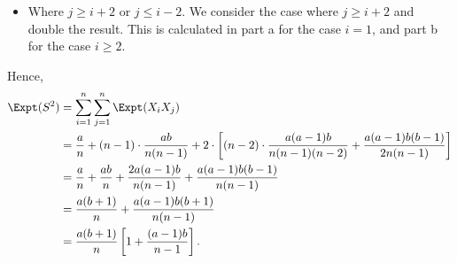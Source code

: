 \begin{enumerate}
\begin{enumerate}
\begin{itemize}
                        \item Where \(j \geq i + 2\) or \(j \leq i - 2\). We consider the case where \(j \geq i + 2\) and double the result. This is calculated in part a for the case \(i = 1\), and part b for the case \(i \geq 2\).
                    \end{itemize}

                    Hence,
                    \begin{align*}
                        \Expt(S^2) & = \sum_{i = 1}^{n} \sum_{j = 1}^{n} \Expt(X_i X_j)                                                                                                                    \\
                                   & = \frac{a}{n} + (n - 1) \cdot \frac{ab}{n(n - 1)} + 2 \cdot \left[(n - 2) \cdot \frac{a (a - 1) b}{n (n - 1) (n - 2)} + \frac{a (a - 1) b (b - 1)}{2n (n - 1)}\right] \\
                                   & = \frac{a}{n} + \frac{ab}{n} + \frac{2 a (a - 1) b}{n (n - 1)} + \frac{a (a - 1) b (b - 1)}{n (n - 1)}                                                                \\
                                   & = \frac{a(b + 1)}{n} + \frac{a (a - 1) b (b + 1)}{n (n - 1)}                                                                                                          \\
                                   & = \frac{a(b + 1)}{n} \left[1 + \frac{(a - 1) b}{n - 1}\right].
                    \end{align*}


\end{enumerate}
\end{enumerate}
